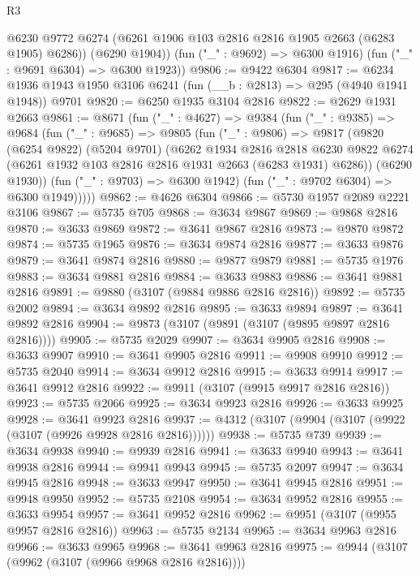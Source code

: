 \begin{lexlean}{R3}
\begin{coremodule}
          @6230
          @9772
          @6274
          (@6261 @1906 @103 @2816 @2816 @1905 @2663 (@6283 @1905) @6286))
        (@6290 @1904))
      (fun ("_" : @9692) => @6300 @1916)
      (fun ("_" : @9691 @6304) => @6300 @1923))
@9806 := @9422 @6304
@9817 := @6234 @1936 @1943 @1950 @3106 @6241 (fun (__b : @2813) => @295 (@4940 @1941 @1948)) @9701
@9820 := @6250 @1935 @3104 @2816
@9822 := @2629 @1931 @2663
@9861 := @8671
    (fun ("_" : @4627) =>
    @9384
      (fun ("_" : @9385) =>
      @9684
        (fun ("_" : @9685) =>
        @9805
          (fun ("_" : @9806) =>
          @9817
            (@9820
              (@6254 @9822)
              (@5204 @9701)
              (@6262
                @1934
                @2816
                @2818
                @6230
                @9822
                @6274
                (@6261 @1932 @103 @2816 @2816 @1931 @2663 (@6283 @1931) @6286))
              (@6290 @1930))
            (fun ("_" : @9703) => @6300 @1942)
            (fun ("_" : @9702 @6304) => @6300 @1949)))))
@9862 := @4626 @6304
@9866 := @5730 @1957 @2089 @2221 @3106
@9867 := @5735 @705
@9868 := @3634 @9867
@9869 := @9868 @2816
@9870 := @3633 @9869
@9872 := @3641 @9867 @2816
@9873 := @9870 @9872
@9874 := @5735 @1965
@9876 := @3634 @9874 @2816
@9877 := @3633 @9876
@9879 := @3641 @9874 @2816
@9880 := @9877 @9879
@9881 := @5735 @1976
@9883 := @3634 @9881 @2816
@9884 := @3633 @9883
@9886 := @3641 @9881 @2816
@9891 := @9880 (@3107 (@9884 @9886 @2816 @2816))
@9892 := @5735 @2002
@9894 := @3634 @9892 @2816
@9895 := @3633 @9894
@9897 := @3641 @9892 @2816
@9904 := @9873 (@3107 (@9891 (@3107 (@9895 @9897 @2816 @2816))))
@9905 := @5735 @2029
@9907 := @3634 @9905 @2816
@9908 := @3633 @9907
@9910 := @3641 @9905 @2816
@9911 := @9908 @9910
@9912 := @5735 @2040
@9914 := @3634 @9912 @2816
@9915 := @3633 @9914
@9917 := @3641 @9912 @2816
@9922 := @9911 (@3107 (@9915 @9917 @2816 @2816))
@9923 := @5735 @2066
@9925 := @3634 @9923 @2816
@9926 := @3633 @9925
@9928 := @3641 @9923 @2816
@9937 := @4312 (@3107 (@9904 (@3107 (@9922 (@3107 (@9926 @9928 @2816 @2816))))))
@9938 := @5735 @739
@9939 := @3634 @9938
@9940 := @9939 @2816
@9941 := @3633 @9940
@9943 := @3641 @9938 @2816
@9944 := @9941 @9943
@9945 := @5735 @2097
@9947 := @3634 @9945 @2816
@9948 := @3633 @9947
@9950 := @3641 @9945 @2816
@9951 := @9948 @9950
@9952 := @5735 @2108
@9954 := @3634 @9952 @2816
@9955 := @3633 @9954
@9957 := @3641 @9952 @2816
@9962 := @9951 (@3107 (@9955 @9957 @2816 @2816))
@9963 := @5735 @2134
@9965 := @3634 @9963 @2816
@9966 := @3633 @9965
@9968 := @3641 @9963 @2816
@9975 := @9944 (@3107 (@9962 (@3107 (@9966 @9968 @2816 @2816))))

\end{coremodule}
\end{lexlean}

